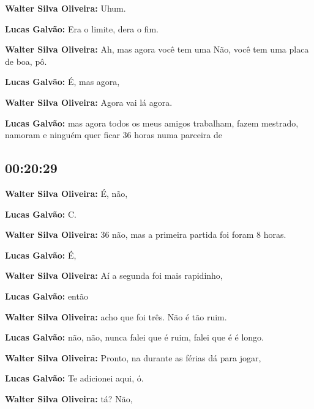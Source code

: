 \textbf{Walter Silva Oliveira:} Uhum.



\textbf{Lucas Galvão:} Era o limite, dera o fim.



\textbf{Walter Silva Oliveira:} Ah, mas agora você tem uma Não, você tem uma placa de boa, pô.



\textbf{Lucas Galvão:} É, mas agora,



\textbf{Walter Silva Oliveira:} Agora vai lá agora.



\textbf{Lucas Galvão:} mas agora todos os meus amigos trabalham, fazem mestrado, namoram e ninguém quer ficar 36 horas numa parceira de



\subsection{\textbf{00:20:29}}



\textbf{Walter Silva Oliveira:} É, não,



\textbf{Lucas Galvão:} C.



\textbf{Walter Silva Oliveira:} 36 não, mas a primeira partida foi foram 8 horas.



\textbf{Lucas Galvão:} É,



\textbf{Walter Silva Oliveira:} Aí a segunda foi mais rapidinho,



\textbf{Lucas Galvão:} então



\textbf{Walter Silva Oliveira:} acho que foi três. Não é tão ruim.



\textbf{Lucas Galvão:} não, não, nunca falei que é ruim, falei que é é longo.



\textbf{Walter Silva Oliveira:} Pronto, na durante as férias dá para jogar,



\textbf{Lucas Galvão:} Te adicionei aqui, ó.



\textbf{Walter Silva Oliveira:} tá? Não,



